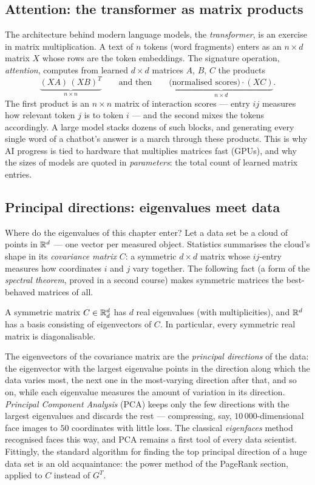 \subsection{Attention: the transformer as matrix products}

The architecture behind modern language models, the \emph{transformer}, is an exercise in matrix
multiplication. A text of $n$ tokens (word fragments) enters as an $n\times d$ matrix $X$ whose rows are
the token embeddings. The signature operation, \emph{attention}, computes from learned $d\times d$
matrices $A$, $B$, $C$ the products
\[
\underbrace{(X A)\,(X B)^T}_{n\times n} \qquad\text{and then}\qquad
\underbrace{\big(\text{normalised scores}\big)\cdot (X C)}_{n\times d}.
\]
The first product is an $n\times n$ matrix of interaction scores — entry $ij$ measures how relevant token
$j$ is to token $i$ — and the second mixes the tokens accordingly. A large model stacks dozens of such
blocks, and generating every single word of a chatbot's answer is a march through these products. This is
why AI progress is tied to hardware that multiplies matrices fast (GPUs), and why the sizes of models are
quoted in \emph{parameters}: the total count of learned matrix entries.

\subsection{Principal directions: eigenvalues meet data}

Where do the eigenvalues of this chapter enter? Let a data set be a cloud of points in $\mathbb{R}^d$ — one
vector per measured object. Statistics summarises the cloud's shape in its \emph{covariance matrix} $C$:
a symmetric $d\times d$ matrix whose $ij$-entry measures how coordinates $i$ and $j$ vary together. The
following fact (a form of the \emph{spectral theorem}, proved in a second course) makes symmetric
matrices the best-behaved matrices of all.

\begin{fact}
A symmetric matrix $C\in\mathbb{R}^d_d$ has $d$ real eigenvalues (with multiplicities), and $\mathbb{R}^d$ has a basis
consisting of eigenvectors of $C$. In particular, every symmetric real matrix is diagonalisable.
\end{fact}

The eigenvectors of the covariance matrix are the \emph{principal directions} of the data: the eigenvector
with the largest eigenvalue points in the direction along which the data varies most, the next one in the
most-varying direction after that, and so on, while each eigenvalue measures the amount of variation in
its direction. \emph{Principal Component Analysis} (PCA) keeps only the few directions with the largest
eigenvalues and discards the rest — compressing, say, $10\,000$-dimensional face images to $50$
coordinates with little loss. The classical \emph{eigenfaces} method recognised faces this way, and PCA
remains a first tool of every data scientist. Fittingly, the standard algorithm for finding the top
principal direction of a huge data set is an old acquaintance: the power method of the PageRank section,
applied to $C$ instead of $G^T$.

